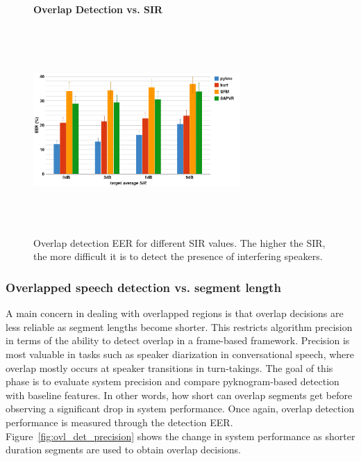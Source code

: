 {\begin{figure}[h!]
	\centering
	\hspace{-1mm}
	\textbf{Overlap Detection vs. SIR}\par\medskip
	\includegraphics[height = 3.1in, width=0.7\textwidth]{figures/ovldet_vs_sir}
	\vspace{-1mm}
	\caption{Overlap detection EER for different SIR values. The higher the SIR, the more difficult it is to detect the presence of interfering speakers.}
	\vspace{0mm}
	\label{fig:ovl_det}
\end{figure}




\newpage
\subsubsection{Overlapped speech detection vs. segment length}
A main concern in dealing with overlapped regions is that overlap decisions are less reliable as segment lengths become shorter. 
This restricts algorithm precision in terms of the ability to detect overlap in a frame-based framework. 
Precision is most valuable in tasks such as speaker diarization in conversational speech, where overlap mostly occurs at speaker transitions in turn-takings. 
The goal of this phase is to evaluate system precision and compare pyknogram-based detection with baseline features. 
In other words, how short can overlap segments get before observing a significant drop in system performance. 
Once again, overlap detection performance is measured through the detection EER. 
Figure~\ref{fig:ovl_det_precision} shows the change in system performance as shorter duration segments are used to obtain overlap decisions. 


}
